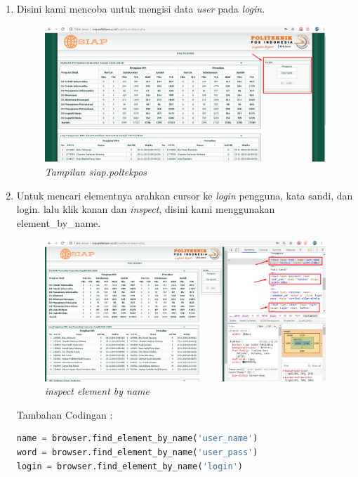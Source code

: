 \begin{enumerate}
\item Disini kami mencoba untuk mengisi data \textit{user} pada \textit{login}.
\begin{figure}[H]
    	\centering
    	\includegraphics[scale=0.3]{figures/siap.png}
    	\caption{\textit{Tampilan siap.poltekpos}}
    	\label{CLI}
	\end{figure}
\item Untuk mencari elementnya arahkan cursor ke \textit{login} pengguna, kata sandi, dan login. lalu klik kanan dan \textit{inspect}, disini kami menggunakan element_by_name.

\begin{figure}[H]
    	\centering
    	\includegraphics[scale=0.3]{figures/inspect1.png}
    	\caption{\textit{inspect element by name}}
    	\label{CLI}
	\end{figure}
	
Tambahan Codingan :
\begin{lstlisting}[language=Python]
name = browser.find_element_by_name('user_name')
word = browser.find_element_by_name('user_pass')
login = browser.find_element_by_name('login')

\end{lstlisting}


\end{enumerate}
